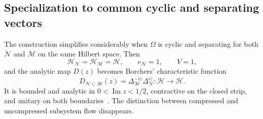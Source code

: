 \documentclass[a4paper,11pt]{article}
\theoremstyle{definition}
\newcommand{\mN}{\mathcal{N}}
\newcommand{\mH}{\mathcal{H}}
\newcommand{\mM}{\mathcal{M}}
\begin{document}
\subsection{Specialization to common cyclic and separating vectors}
\label{subsec:probing-common-cyclic}

The construction simplifies considerably when $\Omega$ is cyclic and
separating for both $\mN$ and $\mM$ on the same Hilbert space.
Then
\begin{equation}
    \mH_{\mN}=\mH_{\mM}=\mathcal H,
    \qquad
    e_{\mN}=1,
    \qquad
    V=1,
\end{equation}
and the analytic map $D(z)$ becomes Borchers' characteristic function
\begin{equation}
    \boxed{
    D_{\mN\subset\mM}(z)
    =
    \Delta_{\mM}^{-iz}\Delta_{\mN}^{iz}
    :
    \mathcal H\to\mathcal H .
    }
    \label{eq:D-common-probing}
\end{equation}
It is bounded and analytic in
$0<\operatorname{Im}z<1/2$, contractive on the closed strip, and unitary on
both boundaries~\cite{revolutionizing}. The distinction between compressed
and uncompressed subsystem flow disappears.
\end{document}
